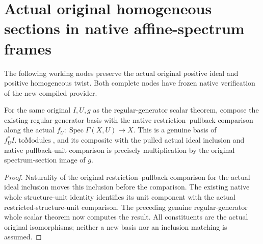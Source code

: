 \section{Actual original homogeneous sections in native affine-spectrum frames}

The following working nodes preserve the actual original positive ideal
and positive homogeneous twist.  Both complete nodes have frozen native verification of the new compiled provider.

\begin{lemma}
\label{lem:resume-original-regular-generator-pullback-scalar}
\leanok
For the same original $I,U,g$ as the regular-generator scalar theorem,
compose the existing regular-generator basis with the native
restriction--pullback comparison along the actual
$f_U:\operatorname{Spec}\Gamma(X,U)\to X$.  This is a genuine basis
of $f_U^*I.\operatorname{toModules}$, and its composite with the pulled
actual ideal inclusion and native pullback-unit comparison is precisely
multiplication by the original spectrum-section image of $g$.
\end{lemma}
\begin{proof}
Naturality of the original restriction--pullback comparison for the
actual ideal inclusion moves this inclusion before the comparison.
The existing native whole structure-unit identity identifies its
unit component with the actual restricted-structure-unit comparison.
The preceding genuine regular-generator whole scalar theorem now
computes the result.  All constituents are the actual original
isomorphisms; neither a new basis nor an inclusion matching is assumed.
\end{proof}

